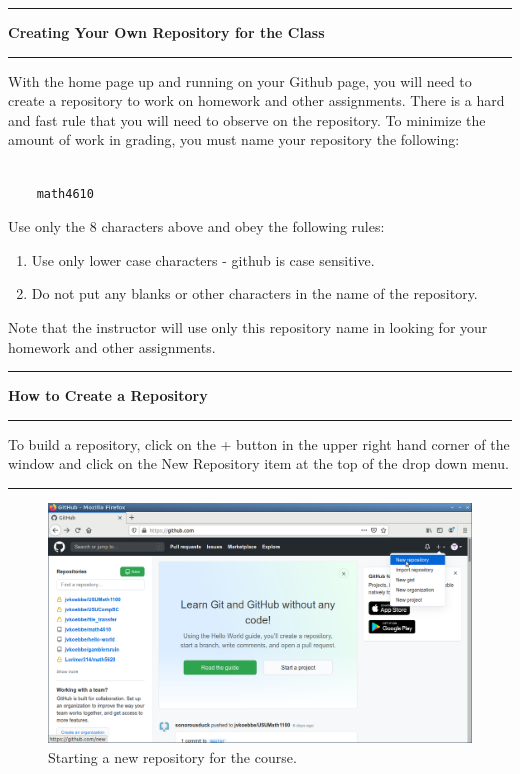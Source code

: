 \documentclass[10pt,fleqn]{article}
\begin{document}
\eject
\vskip0.1in\hrule\vskip0.1in\noindent
{\bf Creating Your Own Repository for the Class} 
\vskip0.1in\hrule\vskip0.1in\noindent
With the home page up and running on your Github page, you will need to create
a repository to work on homework and other assignments. There is a hard and fast
rule that you will need to observe on the repository. To minimize the amount of
work in grading, you must name your repository the following:
\begin{verbatim}

    math4610

\end{verbatim}
Use only the 8 characters above and obey the following rules:
\begin{enumerate}
  \item Use only lower case characters - github is case sensitive.
  \item Do not put any blanks or other characters in the name of the repository.
\end{enumerate}
Note that the instructor will use only this repository name in looking for your
homework and other assignments. 
\vskip0.1in\hrule\vskip0.1in\noindent
{\bf How to Create a Repository} 
\vskip0.1in\hrule\vskip0.1in\noindent
To build a repository, click on the + button in the upper right hand corner of
the window and click on the New Repository item at the top of the drop down
menu.
\vskip0.1in\hrule\vskip0.1in
\vfill
\begin{figure}[h]
\centering
\includegraphics[width=5.0in]{../images/github_06.png}
\caption{Starting a new repository for the course.} 
\end{figure}
\end{document}
